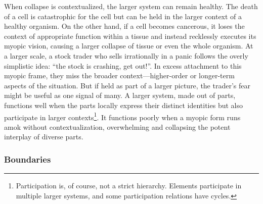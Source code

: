 \documentclass[12pt]{article}
\begin{document}
When collapse is contextualized, the larger system can remain healthy. The death of a cell is catastrophic for the cell but can be held in the larger context of a healthy organism. On the other hand, if a cell becomes cancerous, it loses the context of appropriate function within a tissue and instead recklessly executes its myopic vision, causing a larger collapse of tissue or even the whole organism. At a larger scale, a stock trader who sells irrationally in a panic follows the overly simplistic idea: ``the stock is crashing, get out!''. In excess attachment to this myopic frame, they miss the broader context---higher-order or longer-term aspects of the situation. But if held as part of a larger picture, the trader's fear might be useful as one signal of many. A larger system, made out of parts, functions well when the parts locally express their distinct identities but also participate in larger contexts\footnote{Participation is, of course, not a strict hierarchy. Elements participate in multiple larger systems, and some participation relations have cycles.}. It functions poorly when a myopic form runs amok without contextualization, overwhelming and collapsing the potent interplay of diverse parts. 









\subsubsection*{Boundaries}
\end{document}
